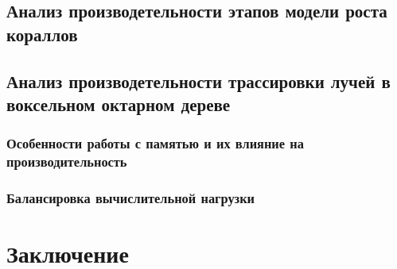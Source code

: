 \documentclass[a4paper,14pt]{extreport}
\begin{document}
\section{Анализ производетельности этапов модели роста кораллов}
\section{Анализ производетельности трассировки лучей в воксельном октарном дереве}
\subsection{Особенности работы с памятью и их влияние на производительность}
\subsection{Балансировка вычислительной нагрузки}

\chapter*{Заключение}

\begin{thebibliography}{99}

\end{thebibliography}



%

%
%
%
%




\end{document}
